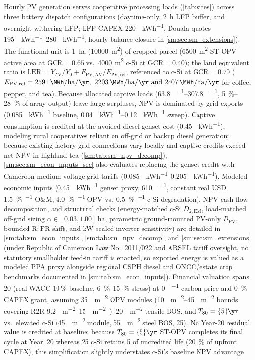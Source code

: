\documentclass[preprint,12pt,a4paper]{elsarticle}
\begin{document}
Hourly PV generation serves cooperative processing loads (\cref{tab:sites}) across three battery dispatch configurations (daytime-only, \qty{2}{\hour} LFP buffer, and overnight-withering LFP; LFP CAPEX \qty{220}{\USD\per\kWh}, Douala quotes \qtyrange{195}{280}{\USD\per\kWh}; hourly balance closure in \cref{sm:sec:sm_extensions}). The functional unit is \qty{1}{\hectare} (\qty{10000}{\square\meter}) of cropped parcel (\qty{6500}{\square\meter} ST-OPV active area at $\mathrm{GCR}=0.65$ vs.\ \qty{4000}{\square\meter} c-Si at $\mathrm{GCR}=0.40$); the land equivalent ratio is $\mathrm{LER} = Y_{\mathrm{AV}}/Y_0 + E_{\mathrm{PV,AV}}/E_{\mathrm{PV,ref}}$, referenced to c-Si at $\mathrm{GCR}=0.70$ ($E_{\mathrm{PV,ref}} = \qtylist{2591;2203;2407}{\MWh\per\hectare\per\yr}$ for coffee, pepper, and tea). Because allocated captive loads (\qtyrange{63.8}{307.8}{\MWh\per\yr}, \qtyrange{5}{28}{\percent} of array output) leave large surpluses, NPV is dominated by grid exports (\qty{0.085}{\USD\per\kWh} baseline, \qtyrange{0.04}{0.12}{\USD\per\kWh} sweep). Captive consumption is credited at the avoided diesel genset cost (\qty{0.45}{\USD\per\kWh}), modeling rural cooperatives reliant on off-grid or backup diesel generation; because existing factory grid connections vary locally and captive credits exceed net NPV in highland tea (\cref{sm:tab:sm_npv_decomp}), \cref{sm:sec:sm_econ_inputs_sec} also evaluates replacing the genset credit with Cameroon medium-voltage grid tariffs (\qtyrange{0.085}{0.205}{\USD\per\kWh}). Modeled economic inputs (\qty{0.45}{\USD\per\kWh} genset proxy, \qty{610}{\XAF\per\USD}, constant real USD, \qty{1.5}{\percent\per\yr} O\&M, \qty{4.0}{\percent\per\yr} OPV vs.\ \qty{0.5}{\percent\per\yr} c-Si degradation), NPV cash-flow decomposition, and structural checks (energy-matched c-Si $D_{2,\mathrm{EM}}$, load-matched off-grid sizing $\alpha\in[\num{0.03},\num{1.00}]\,\unit{\hectare}$, parametric ground-mounted PV-only $D_{\mathrm{PV}}$, bounded $\mathrm{R{:}FR}$ shift, and $\mathrm{kW}$-scaled inverter sensitivity) are detailed in \cref{sm:tab:sm_econ_inputs}, \cref{sm:tab:sm_npv_decomp}, and \cref{sm:sec:sm_extensions} (under Republic of Cameroon Law No.~2011/022 and ARSEL tariff oversight, no statutory smallholder feed-in tariff is enacted, so exported energy is valued as a modeled PPA proxy alongside regional CSPH diesel and ONCC/estate crop benchmarks documented in \cref{sm:tab:sm_econ_inputs}). Financial valuation spans \qty{20}{\yr} (real WACC $\qty{10}{\percent}$ baseline, \qtyrange{6}{15}{\percent} stress) at \qty{0}{\USD\per\tCOtwoe} carbon price and \qty{0}{\percent} CAPEX grant, assuming \qty{35}{\USD\per\square\meter} OPV modules (\qtyrange{10}{45}{\USD\per\square\meter} bounds covering R2R \qtyrange{9.2}{15}{\USD\per\square\meter}~\cite{Machui2014,Gambhir2016}), \qty{20}{\USD\per\square\meter} tensile BOS, and $T_{80}=\qty{5}{\yr}$ vs.\ elevated c-Si (\qty{45}{\USD\per\square\meter} module, \qty{55}{\USD\per\square\meter} steel BOS, \qty{25}{\yr}). No Year-20 residual value is credited at baseline: because $T_{80}=\qty{5}{\yr}$ ST-OPV completes its final cycle at Year~20 whereas \qty{25}{\yr} c-Si retains \qty{5}{\yr} of uncredited life (\qty{20}{\percent} of upfront CAPEX), this simplification slightly understates c-Si's baseline NPV advantage 
\end{document}
